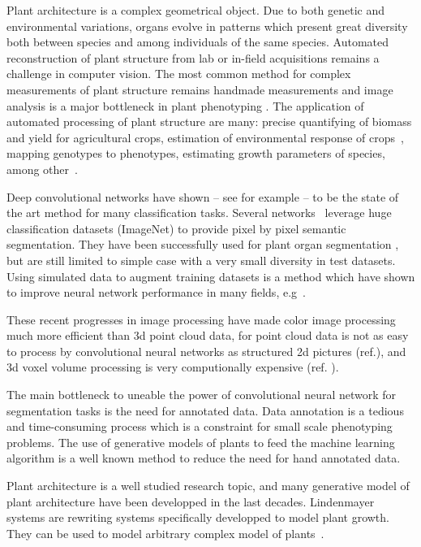 Plant architecture is a complex geometrical object. Due to both genetic and
environmental variations, organs evolve in patterns which present great diversity
both between species and among individuals of the same species. Automated
reconstruction of plant structure from lab or in-field acquisitions remains a challenge in computer
vision. The most common method for complex measurements of plant structure
remains handmade measurements and image analysis is a major bottleneck in plant phenotyping
\cite{minervini2015image}. The application of automated processing of plant structure are many: precise
quantifying of biomass and yield for agricultural crops, estimation of environmental response
of crops~\cite{peirone2018assessing, srivastava2017drought},  mapping genotypes to
phenotypes, estimating growth parameters of species, among other~\cite{denis1998symmetry}.

Deep convolutional networks have shown -- see for example \cite{krizhevsky2012imagenet} --
to be the state of the art method for many classification tasks. Several
networks~\cite{ronneberger2015u, long2015fully} leverage huge classification datasets (ImageNet) to provide pixel by
pixel semantic segmentation. They have been successfully used for plant organ
segmentation \cite{shi2019plant}, but are still limited to simple case with a very
small diversity in test datasets. Using simulated data to augment training
datasets is a method which have shown to improve neural network performance in
many fields, e.g~\cite{qiu2016unrealcv, alhaija2018augmented}.

These recent progresses in image processing have made color image processing
much more efficient than 3d point cloud data, for point cloud data is not as
easy to process by convolutional neural networks as structured 2d pictures
(ref.), and 3d voxel volume processing is very computionally expensive (ref. ).

The main bottleneck to uneable the power of convolutional neural network for segmentation
tasks is the need for annotated data. Data annotation is a tedious and time-consuming process
which is a constraint for small scale phenotyping problems. The use of generative
models of plants to feed the machine learning algorithm is a well known method to
reduce the need for hand annotated data.

Plant architecture is a well studied research topic, and many generative model
of plant architecture have been developped in the last decades. Lindenmayer
systems are rewriting systems specifically developped to model plant growth.
They can be used to model arbitrary complex model of plants~\cite{boudon_l-py:_2012}.


